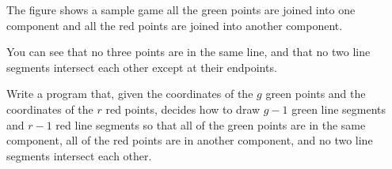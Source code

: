The figure shows a sample game all the green points are joined into one component and all the red points are joined into another component.

You can see that no three points are in the same line, and that no two line segments intersect each other except at their endpoints.

Write a program that, given the coordinates of the $g$ green points and the coordinates of the $r$ red points, decides how to draw $g - 1$ green line segments and $r - 1$ red line segments so that all of the green points are in the same component, all of the red points are in another component, and no two line segments intersect each other.

